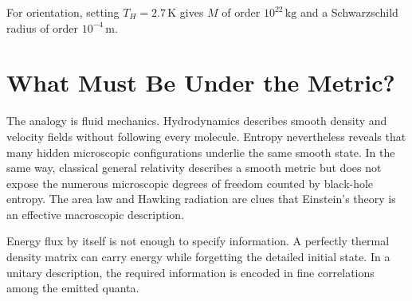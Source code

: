 For orientation, setting \(T_H=2.7\,\mathrm{K}\) gives \(M\) of order \(10^{22}\,\mathrm{kg}\) and a Schwarzschild radius of order \(10^{-4}\,\mathrm{m}\).

\section{What Must Be Under the Metric?}

\begin{classroomqa}
\end{classroomqa}

The analogy is fluid mechanics. Hydrodynamics describes smooth density and velocity fields without following every molecule. Entropy nevertheless reveals that many hidden microscopic configurations underlie the same smooth state. In the same way, classical general relativity describes a smooth metric but does not expose the numerous microscopic degrees of freedom counted by black-hole entropy. The area law and Hawking radiation are clues that Einstein's theory is an effective macroscopic description.

\begin{classroomqa}
\end{classroomqa}

Energy flux by itself is not enough to specify information. A perfectly thermal density matrix can carry energy while forgetting the detailed initial state. In a unitary description, the required information is encoded in fine correlations among the emitted quanta.

